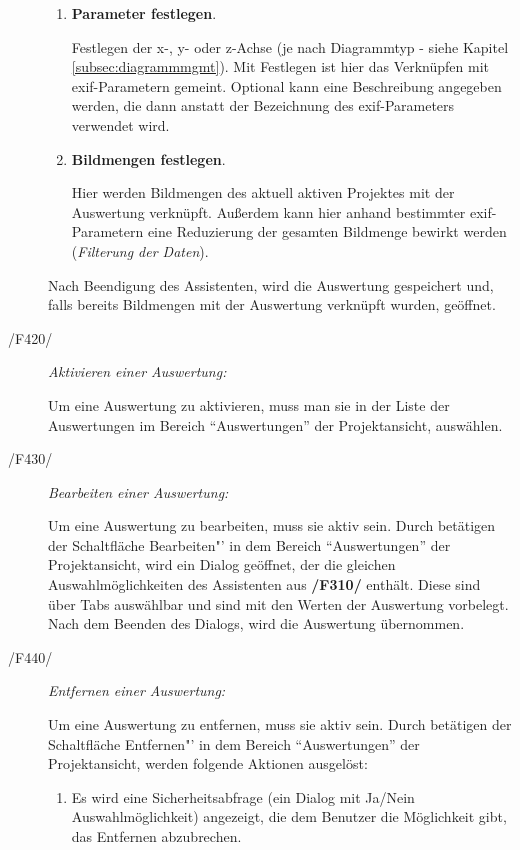 \begin{description}
\begin{enumerate}
				\item \textbf{Parameter festlegen}.\par Festlegen der x-, y- oder z-Achse (je nach Diagrammtyp - siehe Kapitel \ref{subsec:diagrammmgmt}). Mit Festlegen ist hier das Verknüpfen mit \gls{exif}-Parametern gemeint. Optional kann eine Beschreibung angegeben werden, die dann anstatt der Bezeichnung des \gls{exif}-Parameters verwendet wird.

				\item \textbf{Bildmengen festlegen}.\par Hier werden Bildmengen des aktuell aktiven Projektes mit der Auswertung verknüpft. Außerdem kann hier anhand bestimmter \gls{exif}-Parametern eine Reduzierung der gesamten Bildmenge bewirkt werden (\textit{Filterung der Daten}).

			\end{enumerate}

			Nach Beendigung des Assistenten, wird die Auswertung gespeichert und, falls bereits Bildmengen mit der Auswertung verknüpft wurden, geöffnet.
		
		\item[/F420/] \textit{Aktivieren einer Auswertung:}\par Um eine Auswertung zu aktivieren, muss man sie in der Liste der Auswertungen im Bereich "`Auswertungen"' der Projektansicht, auswählen.
		
		\item[/F430/] \textit{Bearbeiten einer Auswertung:}\par Um eine Auswertung zu bearbeiten, muss sie aktiv sein. Durch betätigen der Schaltfläche Bearbeiten"' in dem Bereich "`Auswertungen"' der Projektansicht, wird ein Dialog geöffnet, der die gleichen Auswahlmöglichkeiten des Assistenten aus \textbf{/F310/} enthält. Diese sind über Tabs auswählbar und sind mit den Werten der Auswertung vorbelegt. Nach dem Beenden des Dialogs, wird die Auswertung übernommen.
				
		\item[/F440/] \textit{Entfernen einer Auswertung:}\par Um eine Auswertung zu entfernen, muss sie aktiv sein. Durch betätigen der Schaltfläche Entfernen"' in dem Bereich "`Auswertungen"' der Projektansicht, werden folgende Aktionen ausgelöst:

			\begin{enumerate}

				\item Es wird eine Sicherheitsabfrage (ein Dialog mit Ja/Nein Auswahlmöglichkeit) angezeigt, die dem Benutzer die Möglichkeit gibt, das Entfernen abzubrechen.


\end{enumerate}
\end{description}
